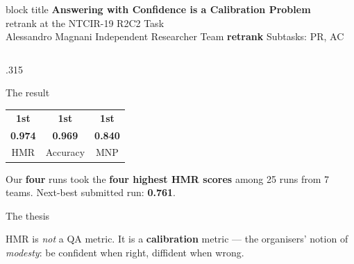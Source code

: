\documentclass[final]{beamer}
\newcommand{\HMR}{\textsc{HMR}}
\newcommand{\MNP}{\textsc{MNP}}
\newcommand{\hero}[1]{{\fontsize{64}{70}\selectfont\bfseries\color{ink}#1}}
\begin{document}
\begin{frame}[t]

\begin{beamercolorbox}[wd=\paperwidth,sep=1.2cm]{block title}
\centering
{\fontsize{80}{92}\selectfont\bfseries Answering with Confidence is a Calibration Problem}\\[0.5cm]
{\fontsize{46}{54}\selectfont retrank at the NTCIR-19 R2C2 Task}\\[0.8cm]
{\fontsize{36}{42}\selectfont Alessandro Magnani \quad\textbar\quad Independent Researcher \quad\textbar\quad Team \textbf{retrank} \quad\textbar\quad Subtasks: PR, AC}
\end{beamercolorbox}
\vspace{1.2cm}

\begin{columns}[t]

\begin{column}{.315\paperwidth}

\begin{block}{The result}
\centering
\begin{tabular}{ccc}
\hero{1st} & \hero{1st} & \hero{1st}\\[0.1cm]
{\Large\bfseries 0.974} & {\Large\bfseries 0.969} & {\Large\bfseries 0.840}\\[0.1cm]
{\large\HMR} & {\large Accuracy} & {\large\MNP}\\
\end{tabular}

\vspace{0.7cm}
{\large Our \textbf{four} runs took the \textbf{four highest \HMR{} scores}
among 25 runs from 7 teams. Next-best submitted run: \textbf{0.761}.}
\end{block}

\begin{block}{The thesis}
{\large
\HMR{} is \emph{not} a QA metric. It is a \textbf{calibration} metric --- the organisers'
notion of \emph{modesty}: be confident when right, diffident when wrong.

\vspace{0.6cm}
\centering
{}

}
\end{block}
\end{column}
\end{columns}
\end{frame}
\end{document}
